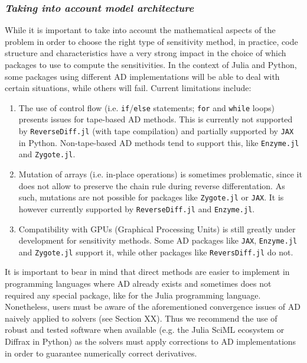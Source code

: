 \subsubsection*{\textit{Taking into account model architecture}}
\label{sec:model_arch}

While it is important to take into account the mathematical aspects of the problem in order to choose the right type of sensitivity method, in practice, code structure and characteristics have a very strong impact in the choice of which packages to use to compute the sensitivities. 
In the context of Julia and Python, some packages using different AD implementations will be able to deal with certain situations, while others will fail. 
Current limitations include:
\begin{enumerate}[label=(\roman*)]
    \item The use of control flow (i.e. \texttt{if}/\texttt{else} statements; \texttt{for} and \texttt{while} loops) presents issues for tape-based AD methods. 
    This is currently not supported by \texttt{ReverseDiff.jl} (with tape compilation) and partially supported by \texttt{JAX} in Python. 
    Non-tape-based AD methods tend to support this, like \texttt{Enzyme.jl} and \texttt{Zygote.jl}.
    \item Mutation of arrays (i.e. in-place operations) is sometimes problematic, since it does not allow to preserve the chain rule during reverse differentation. As such, mutations are not possible for packages like \texttt{Zygote.jl} or \texttt{JAX}. It is however currently supported by \texttt{ReverseDiff.jl} and \texttt{Enzyme.jl}.
    \item Compatibility with GPUs (Graphical Processing Units) is still greatly under development for sensitivity methods. 
    Some AD packages like \texttt{JAX}, \texttt{Enzyme.jl} and \texttt{Zygote.jl} support it, while other packages like \texttt{ReversDiff.jl} do not. 
\end{enumerate}

It is important to bear in mind that direct methods are easier to implement in programming languages where AD already exists and sometimes does not required any special package, like for the Julia programming language.
Nonetheless, users must be aware of the aforementioned convergence issues of AD naively applied to solvers (see Section XX). 
Thus we recommend the use of robust and tested software when available (e.g. the Julia SciML ecosystem or Diffrax in Python) as the solvers must apply corrections to AD implementations in order to guarantee numerically correct derivatives.

